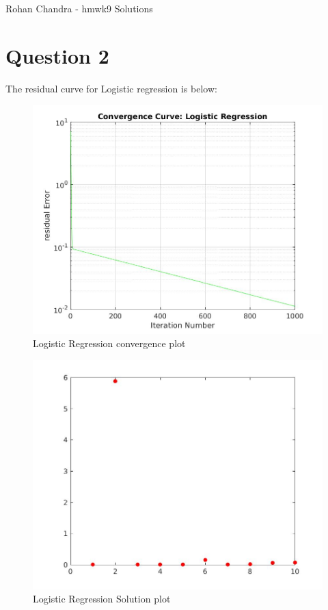 \documentclass{article}
\begin{document}
\begin{center}{\huge  Rohan Chandra - hmwk9    Solutions}\end{center}

\section*{Question 2}
The residual curve for Logistic regression is below:


\begin{figure}[H]
\centering
\includegraphics[width=1.2\linewidth]{LogisticRegression.jpg}
\caption{Logistic Regression convergence plot}
\end{figure}


\begin{figure}[H]
\centering
\includegraphics[width=1.2\linewidth]{LogisticRegression_plot.jpg}
\caption{Logistic Regression Solution plot}
\end{figure}
\end{document}
